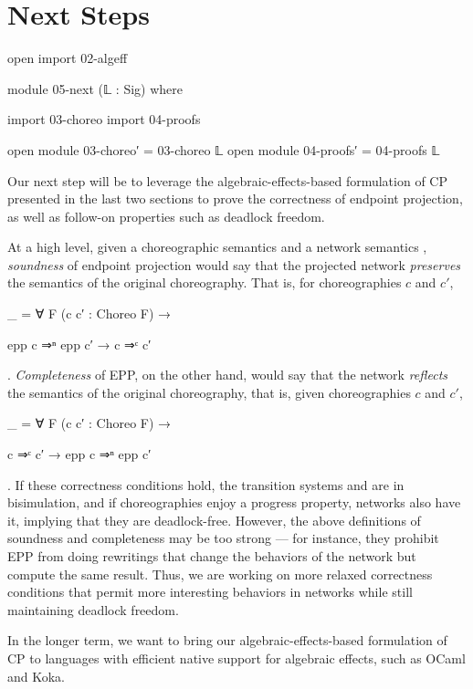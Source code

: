 \section{Next Steps}
\label{sec:next}

\begin{code}[hide]
open import 02-algeff

module 05-next (𝕃 : Sig) where

import 03-choreo
import 04-proofs

open module 03-choreo′ = 03-choreo 𝕃
open module 04-proofs′ = 04-proofs 𝕃

\end{code}

Our next step will be to leverage the algebraic-effects-based formulation of CP presented in the last two sections to prove the correctness of endpoint projection, as well as follow-on properties such as deadlock freedom.

At a high level, given a choreographic semantics  and a network semantics , \emph{soundness} of endpoint projection would say that the projected network \emph{preserves} the semantics of the original choreography.
%
That is, for choreographies $c$ and $c'$,
%
\begin{code}[hide]
_ = ∀ {F} (c c′ : Choreo F) →
\end{code}
%
\begin{code}[inline]
  epp c ⇒ⁿ epp c′ → c ⇒ᶜ c′
\end{code}.
%
\emph{Completeness} of EPP, on the other hand, would say that the network \emph{reflects} the semantics of the original choreography, that is, given choreographies $c$ and $c'$,
%
\begin{code}[hide]
_ = ∀ {F} (c c′ : Choreo F) →
\end{code}
%
\begin{code}[inline]
  c ⇒ᶜ c′ → epp c ⇒ⁿ epp c′
\end{code}.
%
If these correctness conditions hold, the transition systems  and  are in bisimulation,
%
and if choreographies enjoy a progress property, networks also have it, implying that they are deadlock-free.
%
However, the above definitions of soundness and completeness may be too strong --- for instance, they prohibit EPP from doing rewritings that change the behaviors of the network but compute the same result.
%
Thus, we are working on more relaxed correctness conditions that permit more interesting behaviors in networks while still maintaining deadlock freedom.

In the longer term, we want to bring our algebraic-effects-based formulation of CP to languages with efficient native support for algebraic effects, such as OCaml and Koka.
